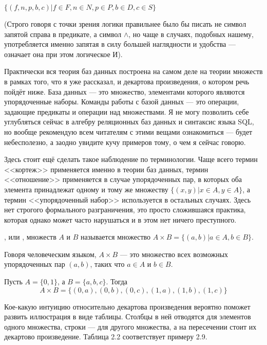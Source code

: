 $\{(f, n, p, b, c)|f\in F, n \in N, p \in P, b \in D, c \in S\}$

(Строго говоря с точки зрения логики правильнее было бы писать не символ запятой справа в предикате, а символ $\wedge$, но чаще в случаях, подобных нашему, употребляется именно запятая в силу большей наглядности и удобства — означает она при этом логическое И).

Практически вся теория баз данных построена на самом деле на теории множеств в рамках того, что я уже рассказал, и декартова произведения, о котором речь пойдёт ниже. База данных — это множество, элементами которого являются упорядоченные наборы. Команды работы с базой данных — это операции, задающие предикаты и операции над множествами. Я не могу позволить себе углубляться сейчас в алгебру реляционных баз данных и синтаксис языка SQL, но вообще рекомендую всем читателям с этими вещами ознакомиться — будет небесполезно, а заодно увидите кучу примеров тому, о чем я сейчас говорю.

Здесь стоит ещё сделать такое наблюдение по терминологии. Чаще всего термин <<кортеж>> применяется именно в теории баз данных, термин <<отношение>> применяется в случае упорядоченных пар, в которых оба элемента принадлежат одному и тому же множеству $\{(x, y)|x\in A, y\in A\}$, а термин <<упорядоченный набор>> используется в остальных случаях. Здесь нет строгого формального разграничения, это просто сложившаяся практика, которая однако может часто нарушаться и в этом нет ничего преступного.

\begin{definition}
, или ,  множеств $A$ и $B$ называется множество $A\times B = \{(a, b)|a\in A, b\in B\}$.
\end{definition}

Говоря человеческим языком, $A\times B$ — это множество всех возможных упорядоченных пар $(a, b)$, таких что $a\in A$ и $b \in B$.

\begin{example}
Пусть $A = \{0, 1\}$, а $B = \{a, b, c\}$. Тогда
$$A\times B = \{(0, a), (0, b), (0, c), (1, a), (1, b), (1, c)\}$$
\end{example}

Кое-какую интуицию относительно декартова произведения вероятно поможет развить иллюстрация в виде таблицы. Столбцы в ней отводятся для элементов одного множества, строки — для другого множества, а на пересечении стоит их декартово произведение. Таблица 2.2 соответствует примеру 2.9.

